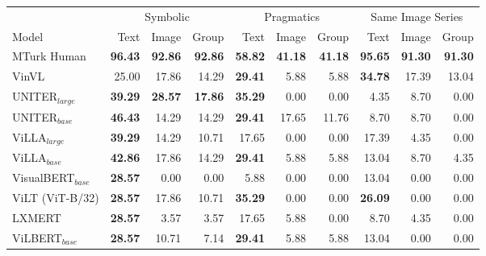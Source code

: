 \begin{table*}
    \centering
   \begin{adjustbox}{max width=\textwidth}
  \begin{tabular}{l|rrr|rrr|rrr}
    \toprule
     &
      \multicolumn{3}{c|}{Symbolic} &
      \multicolumn{3}{c|}{Pragmatics} &
      \multicolumn{3}{c}{Same Image Series} \\
    Model & Text & Image & Group & Text & Image & Group & Text & Image & Group \\\midrule
 MTurk Human                  & \textbf{96.43} & \textbf{92.86} & \textbf{92.86} & \textbf{58.82} & \textbf{41.18} & \textbf{41.18} & \textbf{95.65} & \textbf{91.30} & \textbf{91.30} \\
 VinVL                        & 25.00          & 17.86          & 14.29          & \textbf{29.41} & 5.88           & 5.88           & \textbf{34.78} & 17.39          & 13.04          \\
 UNITER$_{large}$             & \textbf{39.29} & \textbf{28.57} & \textbf{17.86} & \textbf{35.29} & 0.00           & 0.00           & 4.35           & 8.70           & 0.00           \\
 UNITER$_{base}$              & \textbf{46.43} & 14.29          & 14.29          & \textbf{29.41} & 17.65          & 11.76          & 8.70           & 8.70           & 0.00           \\
 ViLLA$_{large}$              & \textbf{39.29} & 14.29          & 10.71          & 17.65          & 0.00           & 0.00           & 17.39          & 4.35           & 0.00           \\
 ViLLA$_{base}$               & \textbf{42.86} & 17.86          & 14.29          & \textbf{29.41} & 5.88           & 5.88           & 13.04          & 8.70           & 4.35           \\
 VisualBERT$_{base}$          & \textbf{28.57} & 0.00           & 0.00           & 5.88           & 0.00           & 0.00           & 13.04          & 0.00           & 0.00           \\
 ViLT (ViT-B/32)              & \textbf{28.57} & 17.86          & 10.71          & \textbf{35.29} & 0.00           & 0.00           & \textbf{26.09} & 0.00           & 0.00           \\
 LXMERT                       & \textbf{28.57} & 3.57           & 3.57           & 17.65          & 5.88           & 0.00           & 8.70           & 4.35           & 0.00           \\
 ViLBERT$_{base}$             & \textbf{28.57} & 10.71          & 7.14           & \textbf{29.41} & 5.88           & 5.88           & 13.04          & 0.00           & 0.00           \\

\end{tabular}
\end{adjustbox}
\end{table*}
